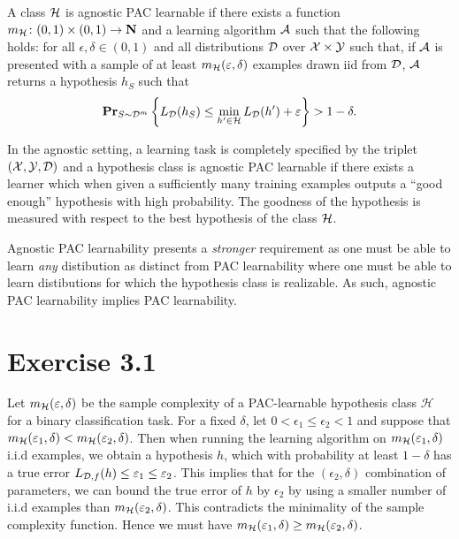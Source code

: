 \begin{definition}
A class $\mathcal{H}$ is agnostic PAC learnable if there exists a function $m_{\mathcal{H}}
\colon (0, 1) \times (0, 1) \rightarrow \mathbf{N}$ and a learning algorithm $\mathcal{A}$
such that the following holds: for all $\epsilon, \delta \in (0, 1)$ and all
distributions $\mathcal{D}$ over $\mathcal{X} \times \mathcal{Y}$ such that, if $\mathcal{A}$ is
presented with a sample of at least $m_{\mathcal{H}}(\varepsilon, \delta)$ examples
drawn iid from $\mathcal{D}$, $\mathcal{A}$ returns a hypothesis $h_S$ such that
\[
   \mathbf{Pr}_{S \sim \mathcal{D}^m} \left \{ L_{\mathcal{D}} (h_S) \leq
        \min_{h' \in \mathcal{H}} L_{\mathcal{D}} (h') + \varepsilon \right \} > 1 - \delta.
\]
\end{definition}
In the agnostic setting, a learning task is completely specified by the triplet
$(\mathcal{X}, \mathcal{Y}, \mathcal{D})$ and a hypothesis class is agnostic PAC learnable if
there exists a learner which when given a sufficiently many training examples
outputs a ``good enough'' hypothesis with high probability. The goodness of the
hypothesis is measured with respect to the best hypothesis of the class $\mathcal{H}$.

Agnostic PAC learnability presents a \emph{stronger} requirement as one must
be able to learn \emph{any} distibution as distinct from PAC learnability where
one must be able to learn distibutions for which the hypothesis class is realizable.
As such, agnostic PAC learnability implies PAC learnability.

\section*{Exercise 3.1}

Let $m_{\mathcal{H}}(\varepsilon, \delta)$ be the sample complexity of a PAC-learnable
hypothesis class $\mathcal{H}$ for a binary classification task. For a fixed
$\delta$, let $0 < \epsilon_1 \leq \epsilon_2 < 1$ and suppose that
$m_{\mathcal{H}}(\varepsilon_1, \delta) < m_{\mathcal{H}}(\varepsilon_2, \delta)$. Then when
running the learning algorithm on $m_{\mathcal{H}}(\varepsilon_1, \delta)$ i.i.d
examples, we obtain a hypothesis $h$, which with probability at least $1 -
\delta$ has a true error $L_{\mathcal{D}, f}(h) \leq \varepsilon_1 \leq \varepsilon_2$. This
implies that for the $(\epsilon_2, \delta)$ combination of parameters, we can
bound the true error of $h$ by $\epsilon_2$ by using a smaller number of i.i.d
examples than $m_{\mathcal{H}}(\varepsilon_2, \delta)$. This contradicts the
minimality of the sample complexity function. Hence we must have
$m_{\mathcal{H}}(\varepsilon_1, \delta) \geq m_{\mathcal{H}}(\varepsilon_2, \delta)$.

